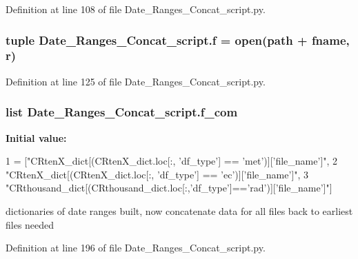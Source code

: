 Definition at line 108 of file Date\+\_\+\+Ranges\+\_\+\+Concat\+\_\+script.\+py.

\hypertarget{namespace_date___ranges___concat__script_ad5658856a51a27b2b1e1471fc153ad62}{}
\subsubsection[{f}]{\setlength{\rightskip}{0pt plus 5cm}tuple Date\+\_\+\+Ranges\+\_\+\+Concat\+\_\+script.\+f = open({\bf path} + fname, \textquotesingle{}r\textquotesingle{})}\label{namespace_date___ranges___concat__script_ad5658856a51a27b2b1e1471fc153ad62}


Definition at line 125 of file Date\+\_\+\+Ranges\+\_\+\+Concat\+\_\+script.\+py.

\hypertarget{namespace_date___ranges___concat__script_a539ab90a74797782c7eaa55a47384597}{}
\subsubsection[{f\+\_\+com}]{\setlength{\rightskip}{0pt plus 5cm}list Date\+\_\+\+Ranges\+\_\+\+Concat\+\_\+script.\+f\+\_\+com}\label{namespace_date___ranges___concat__script_a539ab90a74797782c7eaa55a47384597}
{\bfseries Initial value\+:}
\begin{DoxyCode}
1 = [\textcolor{stringliteral}{"CRtenX\_dict[(CRtenX\_dict.loc[:, 'df\_type'] == 'met')]['file\_name']"},
2              \textcolor{stringliteral}{"CRtenX\_dict[(CRtenX\_dict.loc[:, 'df\_type'] == 'ec')]['file\_name']"},
3              \textcolor{stringliteral}{"CRthousand\_dict[(CRthousand\_dict.loc[:,'df\_type']=='rad')]['file\_name']"}]
\end{DoxyCode}


dictionaries of date ranges built, now concatenate data for all files back to earliest files needed 



Definition at line 196 of file Date\+\_\+\+Ranges\+\_\+\+Concat\+\_\+script.\+py.

\hypertarget{namespace_date___ranges___concat__script_a85f8f04b5018cab654cd0912d726418c}{}
